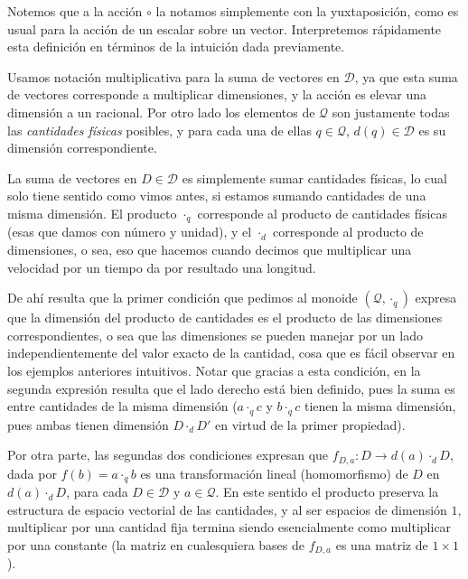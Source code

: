 \documentclass{article}
\def\Dimensions{\mathcal D}
\def\Quantities{\mathcal Q}
\begin{document}
Notemos que a la acción $\circ$ la notamos simplemente con la yuxtaposición, como es usual para la acción de un escalar sobre un vector.
Interpretemos rápidamente esta definición en términos de la intuición dada previamente. 

Usamos notación multiplicativa para la suma de vectores en $\Dimensions$, ya que esta suma de vectores corresponde a
multiplicar dimensiones, y la acción es elevar una dimensión a un racional. Por otro lado los elementos de $\Quantities$ son
justamente todas las \textit{cantidades físicas} posibles, y para cada una de ellas $q \in \Quantities$, $d(q) \in \Dimensions$
es su dimensión correspondiente. 

La suma de vectores en $D \in \Dimensions$ es simplemente sumar cantidades físicas, lo cual
solo tiene sentido como vimos antes, si estamos sumando cantidades de una misma dimensión. El producto $\cdot_q$ corresponde
al producto de cantidades físicas (esas que damos con número y unidad), y el $\cdot_d$ corresponde al producto de dimensiones,
o sea, eso que hacemos cuando decimos que multiplicar una velocidad por un tiempo da por resultado una longitud.

De ahí resulta que la primer condición que pedimos al monoide $(\Quantities, \cdot_q)$ expresa que la dimensión del producto
de cantidades es el producto de las dimensiones correspondientes, o sea que las dimensiones se pueden manejar por un lado
independientemente del valor exacto de la cantidad, cosa que es fácil observar en los ejemplos anteriores intuitivos. Notar
que gracias a esta condición, en la segunda expresión resulta que el lado derecho está bien definido, pues la suma es
entre cantidades de la misma dimensión ($a \cdot_q c$ y $b \cdot_q c$ tienen la misma dimensión, pues ambas tienen dimensión
$D \cdot_d D'$ en virtud de la primer propiedad).

Por otra parte, las segundas dos condiciones expresan que $f_{D,a} : D \rightarrow d(a) \cdot_d D$, dada por 
$f(b) = a \cdot_q b$ es una transformación lineal (homomorfismo)
de $D$ en $d(a) \cdot_d D$, para cada $D \in \Dimensions$ y $a \in \Quantities$. En este sentido el producto preserva la estructura de espacio
vectorial de las cantidades, y al ser espacios de dimensión $1$, multiplicar por una cantidad fija termina siendo esencialmente
como multiplicar por una constante (la matriz en cualesquiera bases de $f_{D,a}$ es una matriz de $1 \times 1$).
\end{document}
